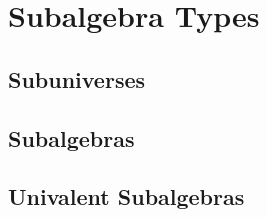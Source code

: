 \documentclass[a4paper,UKenglish,cleveref,autoref,thm-restate,11pt]{../lipics-v2021-wjd}
\begin{document}
\section{Subalgebra Types}\label{sec:subalgebra-types}
\subsection{Subuniverses}\label{sec:subuniverses}\firstsentence{\ualibSubuniverses}{\urlSubuniverses}
%
\subsection{Subalgebras}\label{sec:subalgebras}\firstsentence{\ualibSubalgebras}{\urlSubalgebras}
%
\subsection{Univalent Subalgebras}\label{sec:univ-subalg}\firstsentence{\ualibUnivalent}{\urlUnivalent}
%
















\end{document}
